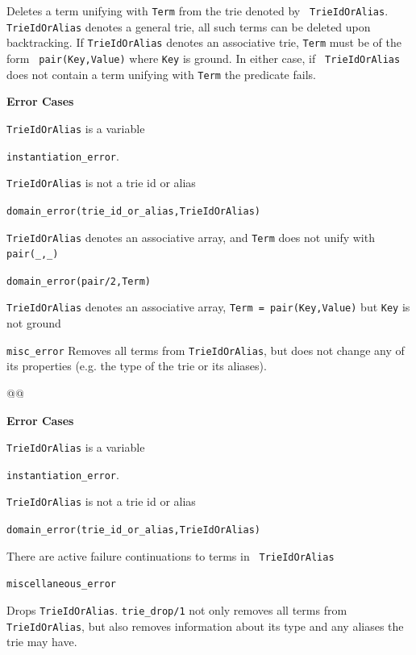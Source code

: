 \begin{description}
%
Deletes a term unifying with {\tt Term} from the trie denoted by {\tt
  TrieIdOrAlias}.  {\tt TrieIdOrAlias} denotes a general trie, all
such terms can be deleted upon backtracking.  If {\tt TrieIdOrAlias}
denotes an associative trie, {\tt Term} must be of the form {\tt
  pair(Key,Value)} where {\tt Key} is ground.  In either case, if {\tt
  TrieIdOrAlias} does not contain a term unifying with {\tt Term} the
predicate fails.

{\bf Error Cases}
\bi
\item 	{\tt TrieIdOrAlias} is a variable
\bi
\item 	{\tt instantiation\_error}.
\ei
\item 	{\tt TrieIdOrAlias} is not a trie id or alias
\bi
\item 	{\tt domain\_error(trie\_id\_or\_alias,TrieIdOrAlias)}
\ei
\item 	{\tt TrieIdOrAlias} denotes an associative array, and {\tt Term} 
  does not unify with {\tt pair(\_,\_)} 
\bi
\item 	{\tt domain\_error(pair/2,Term)}
\ei
\item {\tt TrieIdOrAlias} denotes an associative array, 
  {\tt Term = pair(Key,Value)} but {\tt Key} is not ground 
\bi
\item 	{\tt misc\_error}
\ei
\ei
%
%
Removes all terms from {\tt TrieIdOrAlias}, but does not change any of
its properties (e.g. the type of the trie or its aliases).  

@@

{\bf Error Cases}
\bi
\item 	{\tt TrieIdOrAlias} is a variable
\bi
\item 	{\tt instantiation\_error}.
\ei
\item 	{\tt TrieIdOrAlias} is not a trie id or alias
\bi
\item 	{\tt domain\_error(trie\_id\_or\_alias,TrieIdOrAlias)}
\ei
\item There are active failure continuations to terms in {\tt
  TrieIdOrAlias}
\bi
\item 	{\tt miscellaneous\_error}
\ei
\ei

%
Drops {\tt TrieIdOrAlias}.  {\tt trie\_drop/1} not only removes all
terms from {\tt TrieIdOrAlias}, but also removes information about its
type and any aliases the trie may have.


\end{description}
